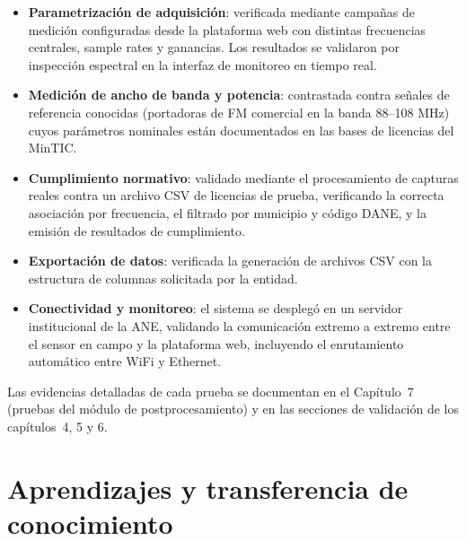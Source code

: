 \begin{itemize}[leftmargin=*]
    \item \textbf{Parametrización de adquisición}: verificada mediante campañas de medición configuradas desde la plataforma web con distintas frecuencias centrales, sample rates y ganancias. Los resultados se validaron por inspección espectral en la interfaz de monitoreo en tiempo real.
    \item \textbf{Medición de ancho de banda y potencia}: contrastada contra señales de referencia conocidas (portadoras de FM comercial en la banda 88--108 MHz) cuyos parámetros nominales están documentados en las bases de licencias del MinTIC.
    \item \textbf{Cumplimiento normativo}: validado mediante el procesamiento de capturas reales contra un archivo CSV de licencias de prueba, verificando la correcta asociación por frecuencia, el filtrado por municipio y código DANE, y la emisión de resultados de cumplimiento.
    \item \textbf{Exportación de datos}: verificada la generación de archivos CSV con la estructura de columnas solicitada por la entidad.
    \item \textbf{Conectividad y monitoreo}: el sistema se desplegó en un servidor institucional de la ANE, validando la comunicación extremo a extremo entre el sensor en campo y la plataforma web, incluyendo el enrutamiento automático entre WiFi y Ethernet.
\end{itemize}

Las evidencias detalladas de cada prueba se documentan en el Capítulo~7 (pruebas del módulo de postprocesamiento) y en las secciones de validación de los capítulos~4, 5 y 6.

\section{Aprendizajes y transferencia de conocimiento}

